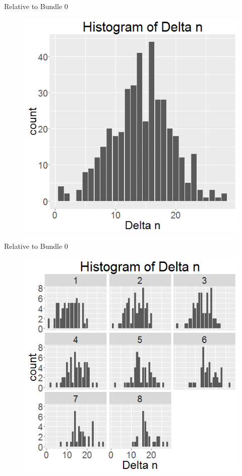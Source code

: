 \documentclass[xcolor=dvipsnames,12pt]{beamer}
\theoremstyle{definition}
\begin{document}
\begin{frame}{Relative to Bundle 0}
\begin{figure}
\graphicspath{ {../../0_relative_to_bundle_0/} }
\includegraphics[scale=0.43]{1_histogram_of_delta_n_rel_to_b0}
\end{figure}
\end{frame}

\begin{frame}{Relative to Bundle 0}
\begin{figure}
\graphicspath{ {../../0_relative_to_bundle_0/} }
\includegraphics[scale=0.43]{1_z_histogram_of_delta_n_rel_to_b0_in_num_of_acc_relerent_bundle_index_rel_to_b0}
\end{figure}
\end{frame}
\end{document}
